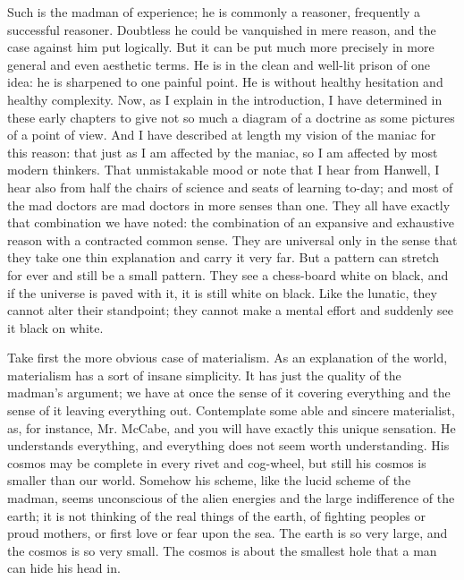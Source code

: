Such is the madman of experience; he is commonly a reasoner, frequently a successful reasoner. Doubtless he could be vanquished in mere reason, and the case against him put logically. But it can be put much more precisely in more general and even aesthetic terms. He is in the clean and well-lit prison of one idea: he is sharpened to one painful point. He is without healthy hesitation and healthy complexity. Now, as I explain in the introduction, I have determined in these early chapters to give not so much a diagram of a doctrine as some pictures of a point of view. And I have described at length my vision of the maniac for this reason: that just as I am affected by the maniac, so I am affected by most modern thinkers. That unmistakable mood or note that I hear from Hanwell, I hear also from half the chairs of science and seats of learning to-day; and most of the mad doctors are mad doctors in more senses than one. They all have exactly that combination we have noted: the combination of an expansive and exhaustive reason with a contracted common sense. They are universal only in the sense that they take one thin explanation and carry it very far. But a pattern can stretch for ever and still be a small pattern. They see a chess-board white on black, and if the universe is paved with it, it is still white on black. Like the lunatic, they cannot alter their standpoint; they cannot make a mental effort and suddenly see it black on white.

Take first the more obvious case of materialism. As an explanation of the world, materialism has a sort of insane simplicity. It has just the quality of the madman’s argument; we have at once the sense of it covering everything and the sense of it leaving everything out. Contemplate some able and sincere materialist, as, for instance, Mr. McCabe, and you will have exactly this unique sensation. He understands everything, and everything does not seem worth understanding. His cosmos may be complete in every rivet and cog-wheel, but still his cosmos is smaller than our world. Somehow his scheme, like the lucid scheme of the madman, seems unconscious of the alien energies and the large indifference of the earth; it is not thinking of the real things of the earth, of fighting peoples or proud mothers, or first love or fear upon the sea. The earth is so very large, and the cosmos is so very small. The cosmos is about the smallest hole that a man can hide his head in.


